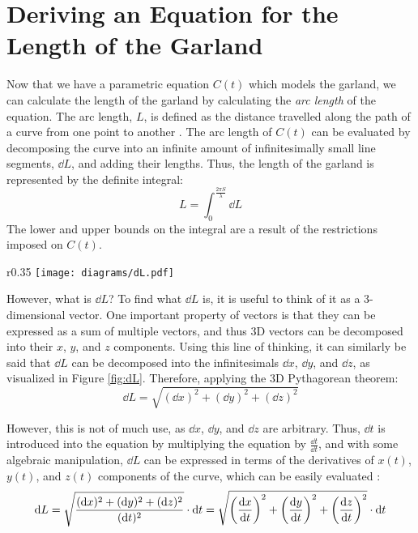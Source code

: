 \section{Deriving an Equation for the Length of the Garland}

Now that we have a parametric equation $C(t)$ which models the garland, we can calculate the length of the garland by calculating the \emph{arc length} of the equation. The arc length, $L$, is defined as the distance travelled along the path of a curve from one point to another \autocite{strangArcLength2016}. The arc length of $C(t)$ can be evaluated by decomposing the curve into an infinite amount of infinitesimally small line segments, $\dd{L}$, and adding their lengths. Thus, the length of the garland is represented by the definite integral:
\begin{equation}
    L=\int_0^\frac{2\pi S}{\lambda} \dd{L} \label{eq:arclen}
\end{equation}
The lower and upper bounds on the integral are a result of the restrictions imposed on $C(t)$.

\begin{wrapfigure}{r}{0.35\textwidth}
    \centering
    \texttt{[image: diagrams/dL.pdf]}
    \caption{$\dd{L}$ in terms of $\dd{x}$, $\dd{y}$, and $\dd{z}$} \label{fig:dL}
\end{wrapfigure}
However, what is $\dd{L}$? To find what $\dd{L}$ is, it is useful to think of it as a 3-dimensional vector. One important property of vectors is that they can be expressed as a sum of multiple vectors, and thus 3D vectors can be decomposed into their $x$, $y$, and $z$  components. Using this line of thinking, it can similarly be said that $\dd{L}$ can be
decomposed into the infinitesimals $\dd{x}$, $\dd{y}$, and $\dd{z}$, as visualized in Figure \ref{fig:dL}. Therefore, applying the 3D Pythagorean theorem:
\begin{equation*}
    \dd{L} = \sqrt{(\dd{x})^2+(\dd{y})^2+(\dd{z})^2}
\end{equation*}

However, this is not of much use, as $\dd{x}$, $\dd{y}$, and $\dd{z}$ are arbitrary. Thus, $\dd{t}$ is introduced into the equation by multiplying the equation by $\frac{\dd{t}}{\dd{t}}$, and with some algebraic manipulation, $\dd{L}$ can be expressed in terms of the derivatives of $x(t)$, $y(t)$, and $z(t)$ components of the curve, which can be easily evaluated \autocite{schlickerArcLength}:
\begin{equation*}
    \dd{L} = \sqrt{\frac{(\dd{x})^2+(\dd{y})^2+(\dd{z})^2}{(\dd{t})^2}} \cdot \dd{t} = \sqrt{\left(\dv{x}{t}\right)^2+\left(\dv{y}{t}\right)^2+\left(\dv{z}{t}\right)^2} \cdot \dd{t}
\end{equation*}


